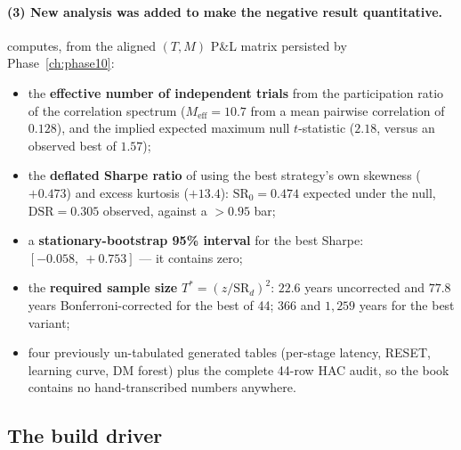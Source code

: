 \paragraph{(3) New analysis was added to make the negative result quantitative.}
 computes, from the aligned $(T,M)$ P\&L matrix
persisted by Phase~\ref{ch:phase10}:
\begin{itemize}
  \item the \textbf{effective number of independent trials} from the participation ratio of
    the correlation spectrum ($M_{\text{eff}}=10.7$ from a mean pairwise correlation of
    $0.128$), and the implied expected maximum null $t$-statistic ($2.18$, versus an observed
    best of $1.57$);
  \item the \textbf{deflated Sharpe ratio} of \cite{bailey2014deflated} using the best
    strategy's own skewness ($+0.473$) and excess kurtosis ($+13.4$):
    $\mathrm{SR}_0=0.474$ expected under the null, $\mathrm{DSR}=0.305$ observed, against a
    $>0.95$ bar;
  \item a \textbf{stationary-bootstrap 95\% interval} for the best Sharpe:
    $[-0.058,\ +0.753]$ --- it contains zero;
  \item the \textbf{required sample size} $T^\ast=(z/\mathrm{SR}_d)^2$: $22.6$ years
    uncorrected and $77.8$ years Bonferroni-corrected for the best of 44; $366$ and
    $1{,}259$ years for the best  variant;
  \item four previously un-tabulated generated tables (per-stage latency, RESET, learning
    curve, DM forest) plus the complete 44-row HAC audit, so the book contains no
    hand-transcribed numbers anywhere.
\end{itemize}

\subsection{The build driver}

